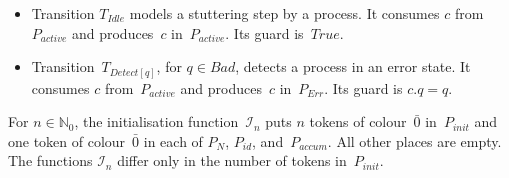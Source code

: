 \documentclass[11pt]{article}
\theoremstyle{definition}
\newcommand{\NatZero}{\mathbb{N}_0}
\begin{document}
\begin{itemize}
  \item Transition $T_{\mathit{Idle}}$ models a stuttering step by a process.
    It consumes $c$ from~$P_{\mathit{active}}$ and
    produces~$c$ in~$P_{\mathit{active}}$. Its guard is~$\mathit{True}$.

  \item Transition~$T_{\mathit{Detect}[q]}$, for $q \in \mathit{Bad}$, detects
    a process in an error state. It consumes $c$ from~$P_{\mathit{active}}$ and
    produces~$c$ in~$P_{\mathit{Err}}$. Its guard is $c.q = q$.

\end{itemize}

For $n \in \NatZero$, the initialisation function~$\mathcal{I}_n$ puts
$n$ tokens of colour~$\bar{0}$ in~$P_{\mathit{init}}$ and one token of
colour~$\bar{0}$ in each of $P_N$, $P_{\mathit{id}}$,
and~$P_{\mathit{accum}}$. All other places are empty. The functions
$\mathcal{I}_n$ differ only in the number of tokens in~$P_{\mathit{init}}$.
\end{document}
